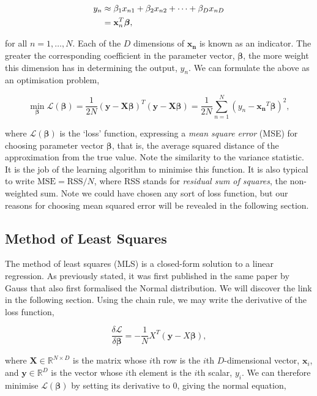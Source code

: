 \documentclass[11pt]{amsart}
\begin{document}
\begin{align}
y_n &\approx \beta_1x_{n1} + \beta_2x_{n2} + \cdots + \beta_Dx_{nD} \notag \\
&= \mathbf{x}_n^T\boldsymbol\beta, \notag
\end{align}

for all $n = 1, \dots, N$. Each of the $D$ dimensions of $\mathbf{x_n}$ is known as an indicator. The greater the corresponding coefficient in the parameter vector, $\boldsymbol\beta$, the more weight this dimension has in determining the output, $y_n$. We can formulate the above as an optimisation problem,

$$\min_{\boldsymbol\beta}\mathcal{L}(\boldsymbol\beta) = \frac{1}{2N}(\mathbf{y} - \mathbf{X}\boldsymbol\beta)^T(\mathbf{y} - \mathbf{X}\boldsymbol\beta) = \frac{1}{2N}\sum_{n=1}^{N}(y_n - \mathbf{x_n}^T\boldsymbol\beta)^2,$$

where $\mathcal{L}(\boldsymbol\beta)$ is the `loss' function, expressing a \emph{mean square error} (MSE) for choosing parameter vector $\boldsymbol\beta$, that is, the average squared distance of the approximation from the true value. Note the similarity to the variance statistic. It is the job of the learning algorithm to minimise this function. It is also typical to write $\text{MSE} = \text{RSS}/N$, where RSS stands for \emph{residual sum of squares}, the non-weighted sum. Note we could have chosen any sort of loss function, but our reasons for choosing mean squared error will be revealed in the following section.

\subsection{Method of Least Squares}

The method of least squares (MLS) is a closed-form solution to a linear regression. As previously stated, it was first published in the same paper by Gauss that also first formalised the Normal distribution. We will discover the link in the following section. Using the chain rule, we may write the derivative of the loss function,

$$\frac{\delta\mathcal{L}}{\delta\boldsymbol\beta} = -\frac{1}{N}X^T(\mathbf{y} - X\boldsymbol\beta),$$

where $\mathbf{X} \in \mathbb{R}^{N\times D}$ is the matrix whose $i$th row is the $i$th $D$-dimensional vector, $\mathbf{x}_i$, and $\mathbf{y} \in \mathbb{R}^D$ is the vector whose $i$th element is the $i$th scalar, $y_i$. We can therefore minimise $\mathcal{L}(\boldsymbol\beta)$ by setting its derivative to 0, giving the normal equation,
\end{document}

